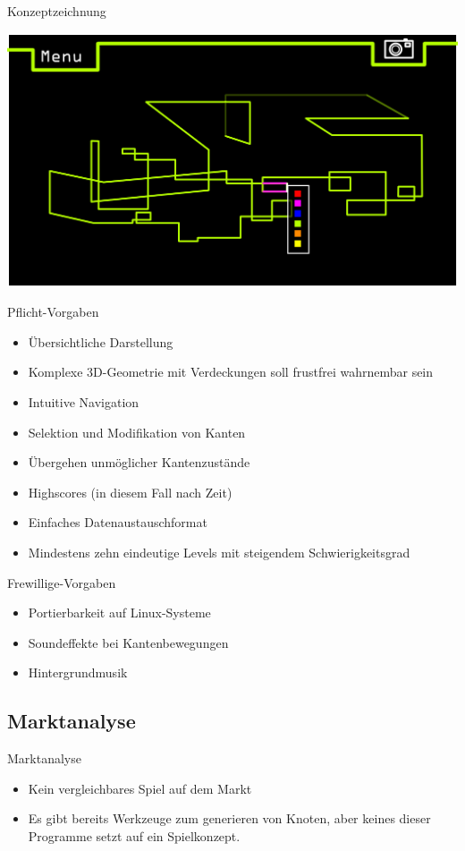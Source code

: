 \documentclass[18pt]{beamer}
\begin{document}
\begin{frame}{Konzeptzeichnung}
\begin{center}
\includegraphics[scale=0.3]{mockup}
\end{center}

\end{frame}
\begin{frame}{Pflicht-Vorgaben}
\begin{itemize}
\item Übersichtliche Darstellung
\item Komplexe 3D-Geometrie mit Verdeckungen soll frustfrei wahrnembar sein
\item Intuitive Navigation
\item Selektion und Modifikation von Kanten
\item Übergehen unmöglicher Kantenzustände
\item Highscores (in diesem Fall nach Zeit)
\item Einfaches Datenaustauschformat
\item Mindestens zehn eindeutige Levels mit steigendem Schwierigkeitsgrad
\end{itemize}
\end{frame}

\begin{frame}{Frewillige-Vorgaben}
\begin{itemize}
\item Portierbarkeit auf Linux-Systeme
\item Soundeffekte bei Kantenbewegungen
\item Hintergrundmusik
\end{itemize}
\end{frame}

\subsection{Marktanalyse}
\begin{frame}{Marktanalyse}

\begin{itemize}
\item Kein vergleichbares Spiel auf dem Markt
\item Es gibt bereits Werkzeuge zum generieren von Knoten, aber keines dieser Programme setzt auf ein Spielkonzept.

\end{itemize}
\end{frame}
\end{document}
